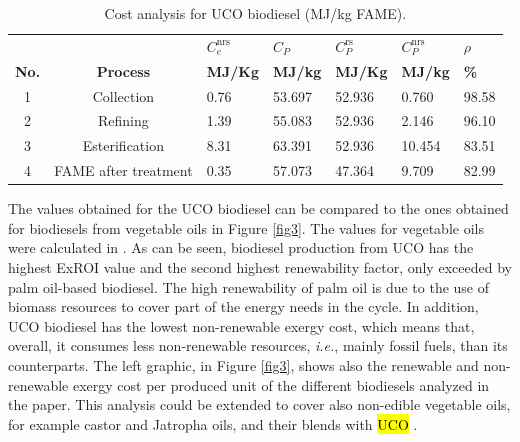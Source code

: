 \documentclass[sustainability,article,accept,moreauthors,pdftex,12pt,a4paper]{mdpi}
\newcommand{\ems}[3][\phantom{\ast}]{\ensuremath{{#2}_{#3}^\mathrm{#1}}}
\begin{document}
\begin{table}[H]
 \centering
 \caption[Cost analysis for UCO biodisel]{Cost analysis for UCO biodiesel (MJ/kg FAME).}
 \begin{tabularx}{0.8\textwidth}{ccZZZZZ}
 \toprule
  &       & \boldmath$\ems[nrs]{C}{e}$ & \boldmath$C_P$ & \boldmath$\ems[rs]{C}{P}$ & \boldmath$\ems[nrs]{C}{P}$ & \boldmath$\rho$ \\
 \textbf{No. } &\textbf{ Process     }& \textbf{MJ/Kg } & \textbf{MJ/kg} & \textbf{MJ/Kg} & \textbf{MJ/kg} & \textbf{\%} \\
  & Collection   & 0.76 & 53.697 & 52.936 & 0.760 & 98.58 \\
 2 & Refining    & 1.39 & 55.083 & 52.936 & 2.146 & 96.10 \\
 3 & Esterification  & 8.31 & 63.391 & 52.936 & 10.454 & 83.51 \\
 4 & FAME after treatment & 0.35 & 57.073 & 47.364 & 9.709 & 82.99 \\
 \bottomrule
 \end{tabularx}%
 \label{table5}%
\end{table}%

The values obtained for the UCO biodiesel can be compared to the ones obtained for biodiesels from vegetable oils in Figure \ref{fig3}. The values for vegetable oils were calculated in \cite{FontdeMoraThesis2013}. As can be seen, biodiesel production from UCO has the highest ExROI value and the second highest renewability factor, only exceeded by palm oil-based biodiesel. The high renewability of palm oil is due to the use of biomass resources to cover part of the energy needs in the cycle. In addition, UCO biodiesel has the lowest non-renewable exergy cost, which means that, overall, it consumes less non-renewable resources, \textit{i.e.}, mainly fossil fuels, than its counterparts. The left graphic, in Figure \ref{fig3}, shows also the renewable and non-renewable exergy cost per produced unit of the different biodiesels analyzed in the paper. This analysis could be extended to cover also non-edible vegetable oils, for example castor and Jatropha oils, and their blends with \hl{UCO} \cite{Kannan2013}. %
\end{document}
